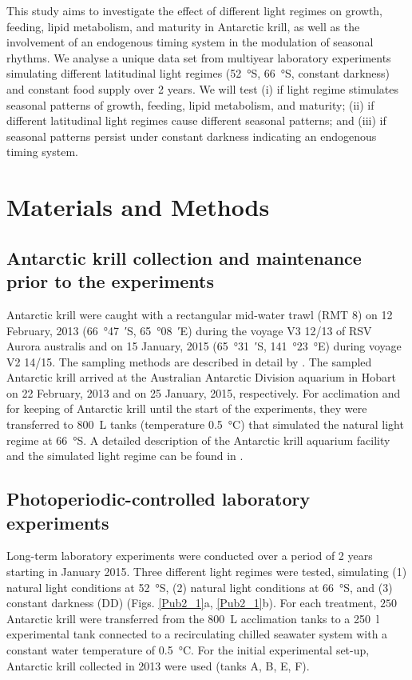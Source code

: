 This study aims to investigate the effect of different light regimes on growth,
feeding, lipid metabolism, and maturity in Antarctic krill, as well as the
involvement of an endogenous timing system in the modulation of seasonal
rhythms. We analyse a unique data set from multiyear laboratory experiments
simulating different latitudinal light regimes (\SI{52}{\degree}S,
\SI{66}{\degree}S, constant darkness) and constant food supply over 2 years. We
will test (i) if light regime stimulates seasonal patterns of growth, feeding,
lipid metabolism, and maturity; (ii) if different latitudinal light regimes
cause different seasonal patterns; and (iii) if seasonal patterns persist under
constant darkness indicating an endogenous timing system.

\section{Materials and Methods}

\subsection{Antarctic krill collection and maintenance prior to the experiments}

Antarctic krill were caught with a rectangular mid-water trawl (RMT 8) on 12
February, 2013 (\SI{66}{\degree}\SI{47}{\arcmin}S,
\SI{65}{\degree}\SI{08}{\arcmin}E) during the voyage V3 12/13 of RSV Aurora
australis and on 15 January, 2015 (\SI{65}{\degree}\SI{31}{\arcmin}S,
\SI{141}{\degree}\SI{23}{\degree}E) during voyage V2 14/15. The sampling
methods are described in detail by \citet{king_krill_2003}. The sampled
Antarctic krill arrived at the Australian Antarctic Division aquarium in Hobart
on 22 February, 2013 and on 25 January, 2015, respectively. For acclimation and
for keeping of Antarctic krill until the start of the experiments, they were
transferred to \SI{800}{\liter} tanks (temperature \SI{0.5}{\celsius}) that
simulated the natural light regime at \SI{66}{\degree}S. A detailed description
of the Antarctic krill aquarium facility and the simulated light regime can be
found in \citet{kawaguchi_experimental_2010}.

\subsection{Photoperiodic-controlled laboratory experiments} 

Long-term laboratory experiments were conducted over a period of 2 years
starting in January 2015. Three different light regimes were tested, simulating
(1) natural light conditions at \SI{52}{\degree}S, (2) natural light conditions
at \SI{66}{\degree}S, and (3) constant darkness (DD) (Figs. \ref{Pub2_1}a,
\ref{Pub2_1}b). For each treatment, $250$ Antarctic krill were transferred from
the \SI{800}{\liter} acclimation tanks to a \SI{250}{\litre} experimental tank
connected to a recirculating chilled seawater system with a constant water
temperature of \SI{0.5}{\celsius}. For the initial experimental set-up,
Antarctic krill collected in 2013 were used (tanks A, B, E, F). 


